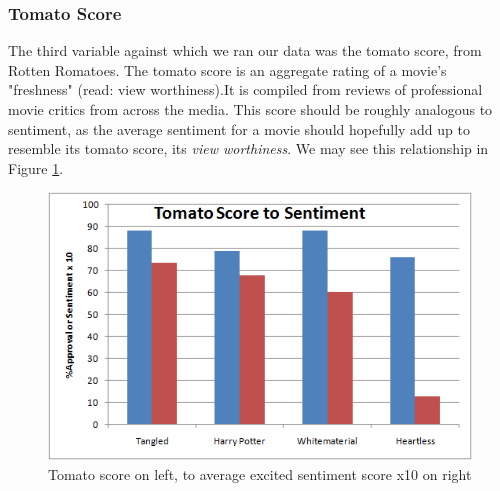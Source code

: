 \documentclass[11pt]{article}
\begin{document}
\subsubsection{Tomato Score}
The third variable against which we ran our data was the tomato score, from Rotten Romatoes. The tomato score is an aggregate rating of a movie's "freshness" (read: view worthiness).It is compiled from reviews of professional movie critics from across the media. This score should be roughly analogous to sentiment, as the average sentiment for a movie should hopefully add up to resemble its tomato score, its \textit{view worthiness}. We may see this relationship in Figure \ref{fig:tscoretos}.
\begin{figure}[ht!]
\centering
\includegraphics[scale=.55]{img/tstos.png} 
\caption{Tomato score on left, to average excited sentiment score x10 on right}
\label{fig:tscoretos}
\end{figure}
\end{document}

